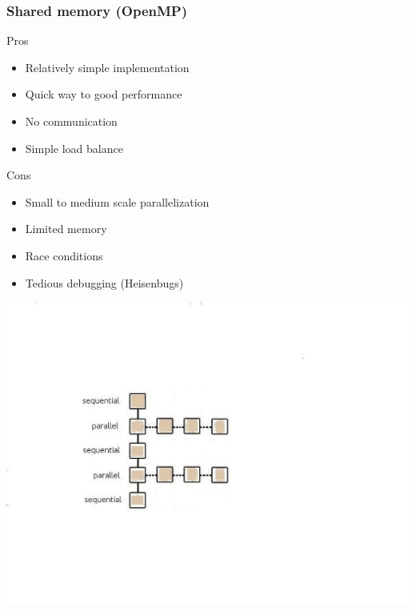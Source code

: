 \documentclass[mathserif]{beamer}
\begin{document}
\begin{frame}
    \frametitle{Shared memory (OpenMP)}
    \begin{minipage}[b]{0.45\linewidth}
	Pros
	\begin{itemize}
	    \item Relatively simple implementation
	    \item Quick way to good performance
	    \item No communication
	    \item Simple load balance
	\end{itemize}
	Cons
        \begin{itemize}
	    \item Small to medium scale parallelization
	    \item Limited memory
	    \item Race conditions
	    \item Tedious debugging (Heisenbugs)
	\end{itemize}
    \end{minipage}
    \hfill
    \begin{minipage}[b]{0.4\linewidth}
	\includegraphics[viewport = 120 160 460 450, clip, scale=0.4]{figures/parallel_OMP.pdf}
	\ \\
	\ \\
	\ \\
	\ \\
    \end{minipage}
\end{frame}
\end{document}
